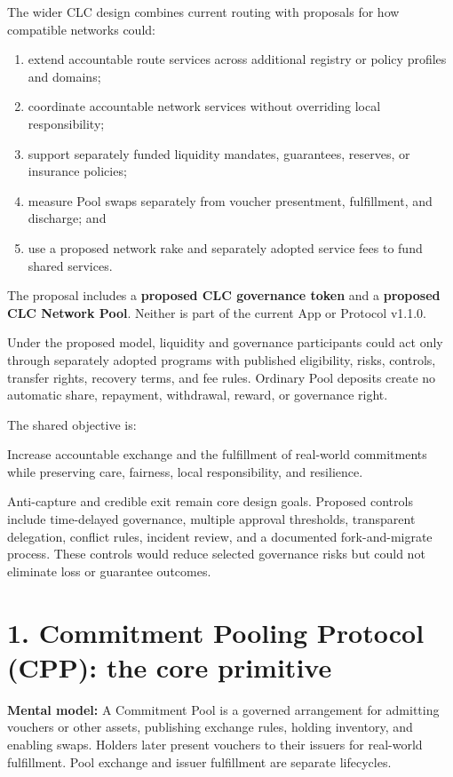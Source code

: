 \documentclass[11pt]{article}
\begin{document}
The wider CLC design combines current routing with proposals for how compatible networks could:

\begin{enumerate}[leftmargin=*]
\item extend accountable route services across additional registry or policy profiles and domains;
\item coordinate accountable network services without overriding local responsibility;
\item support separately funded liquidity mandates, guarantees, reserves, or insurance policies;
\item measure Pool swaps separately from voucher presentment, fulfillment, and discharge; and
\item use a proposed network rake and separately adopted service fees to fund shared services.
\end{enumerate}
The proposal includes a \textbf{proposed CLC governance token} and a \textbf{proposed CLC Network Pool}. Neither is part of the current App or Protocol v1.1.0.

Under the proposed model, liquidity and governance participants could act only through separately adopted programs with published eligibility, risks, controls, transfer rights, recovery terms, and fee rules. Ordinary Pool deposits create no automatic share, repayment, withdrawal, reward, or governance right.

The shared objective is:

Increase accountable exchange and the fulfillment of real-world commitments while preserving care, fairness, local responsibility, and resilience.

Anti-capture and credible exit remain core design goals. Proposed controls include time-delayed governance, multiple approval thresholds, transparent delegation, conflict rules, incident review, and a documented fork-and-migrate process. These controls would reduce selected governance risks but could not eliminate loss or guarantee outcomes.


\section*{1. Commitment Pooling Protocol (CPP): the core primitive}

\textbf{Mental model:} A Commitment Pool is a governed arrangement for admitting vouchers or other assets, publishing exchange rules, holding inventory, and enabling swaps. Holders later present vouchers to their issuers for real-world fulfillment. Pool exchange and issuer fulfillment are separate lifecycles.
\end{document}
